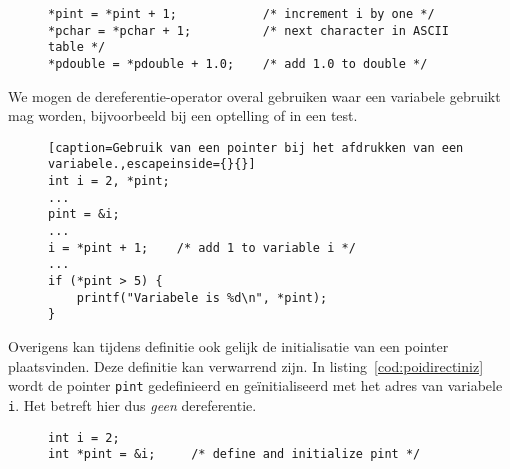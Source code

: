 \begin{figure}[!ht]
\begin{lstlisting}[caption=Gebruik van pointers bij toekenningen.]
*pint = *pint + 1;            /* increment i by one */
*pchar = *pchar + 1;          /* next character in ASCII table */
*pdouble = *pdouble + 1.0;    /* add 1.0 to double */
\end{lstlisting}
\end{figure}

We mogen de dereferentie-operator overal gebruiken waar een variabele gebruikt mag worden, bijvoorbeeld bij een optelling of in een test.

\begin{figure}[!ht]
\begin{lstlisting}[caption=Gebruik van een pointer bij het afdrukken van een variabele.,escapeinside={}{}]
int i = 2, *pint;
...
pint = &i;
...
i = *pint + 1;    /* add 1 to variable i */
...
if (*pint > 5) {
    printf("Variabele is %d\n", *pint);
}
\end{lstlisting}
\end{figure}

Overigens kan tijdens definitie ook gelijk de initialisatie van een pointer plaatsvinden. Deze definitie kan verwarrend zijn. In listing~\ref{cod:poidirectiniz} wordt de pointer \texttt{pint} gedefinieerd en geïnitialiseerd met het adres van variabele \texttt{i}. Het betreft hier dus \textsl{geen} dereferentie.

\begin{figure}[!ht]
\begin{lstlisting}[caption=Definitie en initialisatie van een pointer.,label=cod:poidirectiniz]
int i = 2;
int *pint = &i;     /* define and initialize pint */
\end{lstlisting}
\end{figure}


